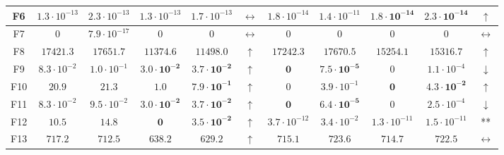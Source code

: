 \begin{table*}[!t]
\begin{scriptsize}
\begin{tabular}{c || c c | c c c || c c | c c c}
F6  & $1.3 \cdot 10^{-13}$ & $2.3 \cdot 10^{-13}$  & $1.3 \cdot 10^{-13}$          & $1.7 \cdot 10^{-13}$          & $\leftrightarrow$ & $1.8 \cdot 10^{-14}$ & $1.4 \cdot 10^{-11}$          & $\mathbf{1.8 \cdot 10^{-14}}$ & $\mathbf{2.3 \cdot 10^{-14}}$ & $\uparrow$         \\ \hline
F7  & $0$                  & $7.9 \cdot 10^{-17}$  & $0$                           & $0$                           & $\leftrightarrow$ & $0$                  & $0$                           & $0$                           & $0$                           & $\leftrightarrow$  \\ \hline
F8  & $17421.3$            & $17651.7$             & $\mathbf{11374.6}$            & $\mathbf{11498.0}$            & $\uparrow$        & $17242.3$            & $17670.5$                     & $\mathbf{15254.1}$            & $\mathbf{15316.7}$            & $\uparrow$         \\ \hline
F9  & $8.3 \cdot 10^{-2}$  & $1.0 \cdot 10^{-1}$   & $\mathbf{3.0 \cdot 10^{-2}}$  & $\mathbf{3.7 \cdot 10^{-2}}$  & $\uparrow$        & $\mathbf{0}$         & $\mathbf{7.5 \cdot 10^{-5}}$  & $0$                           & $1.1 \cdot 10^{-4}$           & $\downarrow$       \\ \hline
F10 & $20.9$               & $21.3$                & $\mathbf{1.0}$                & $\mathbf{7.9 \cdot 10^{-1}}$  & $\uparrow$        & $0$                  & $3.9 \cdot 10^{-1}$           & $\mathbf{0}$                  & $\mathbf{4.3 \cdot 10^{-2}}$  & $\uparrow$         \\ \hline
F11 & $8.3 \cdot 10^{-2}$  & $9.5 \cdot 10^{-2}$   & $\mathbf{3.0 \cdot 10^{-2}}$  & $\mathbf{3.7 \cdot 10^{-2}}$  & $\uparrow$        & $\mathbf{0}$         & $\mathbf{6.4 \cdot 10^{-5}}$  & $0$                           & $2.5 \cdot 10^{-4}$           & $\downarrow$       \\ \hline
F12 & $10.5$               & $14.8$                & $\mathbf{0}$                  & $\mathbf{3.5 \cdot 10^{-2}}$  & $\uparrow$        & $3.7 \cdot 10^{-12}$ & $3.4 \cdot 10^{-2}$           & $1.3 \cdot 10^{-11}$          & $1.5 \cdot 10^{-11}$          & **                 \\ \hline
F13 & $717.2$              & $712.5$               & $\mathbf{638.2}$              & $\mathbf{629.2}$              & $\uparrow$        & $715.1$              & $723.6$                       & $714.7$                       & $722.5$                       & $\leftrightarrow$  \\ \hline

\end{tabular}
\end{scriptsize}
\end{table*}
